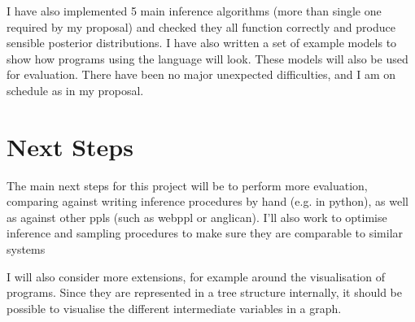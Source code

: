 \documentclass[12pt,a4paper]{article}
\begin{document}
I have also implemented 5 main inference algorithms (more than single one required by my proposal) and checked they all function correctly and produce sensible posterior distributions. I have also written a set of example models to show how programs using the language will look. These models will also be used for evaluation. There have been no major unexpected difficulties, and I am on schedule as in my proposal.

\section*{Next Steps}
The main next steps for this project will be to perform more evaluation, comparing against writing inference procedures by hand (e.g. in python), as well as against other ppls (such as webppl or anglican). I'll also work to optimise inference and sampling procedures to make sure they are comparable to similar systems

I will also consider more extensions, for example around the visualisation of programs. Since they are represented in a tree structure internally, it should be possible to visualise the different intermediate variables in a graph.
\end{document}
